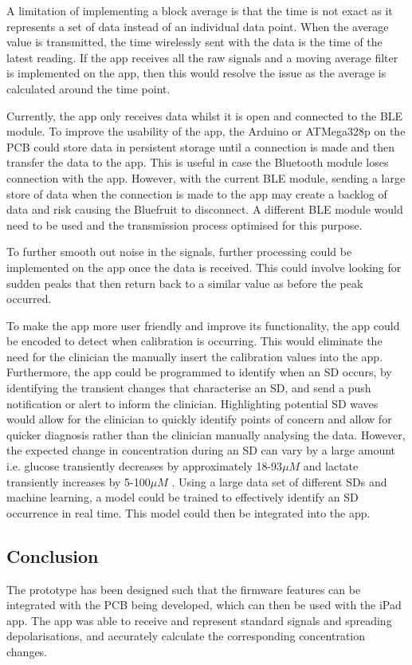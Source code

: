 A limitation of implementing a block average is that the time is not exact as it represents a set of data instead of an individual data point. When the average value is transmitted, the time wirelessly sent with the data is the time of the latest reading. If the app receives all the raw signals and a moving average filter is implemented on the app, then this would resolve the issue as the average is calculated around the time point.

Currently, the app only receives data whilst it is open and connected to the BLE module. To improve the usability of the app, the Arduino or ATMega328p on the PCB could store data in persistent storage until a connection is made and then transfer the data to the app. This is useful in case the Bluetooth module loses connection with the app. However, with the current BLE module, sending a large store of data when the connection is made to the app may create a backlog of data and risk causing the Bluefruit to disconnect. A different BLE module would need to be used and the transmission process optimised for this purpose.

To further smooth out noise in the signals, further processing could be implemented on the app once the data is received. This could involve looking for sudden peaks that then return back to a similar value as before the peak occurred. 

To make the app more user friendly and improve its functionality, the app could be encoded to detect when calibration is occurring. This would eliminate the need for the clinician the manually insert the calibration values into the app. Furthermore, the app could be programmed to identify when an SD occurs, by identifying the transient changes that characterise an SD, and send a push notification or alert to inform the clinician. Highlighting potential SD waves would allow for the clinician to quickly identify points of concern and allow for quicker diagnosis rather than the clinician manually analysing the data. However, the expected change in concentration during an SD can vary by a large amount i.e. glucose transiently decreases by approximately 18-93$\mu M$ and lactate transiently increases by 5-100$\mu M$ \cite{Rogers2017}. Using a large data set of different SDs and machine learning, a model could be trained to effectively identify an SD occurrence in real time. This model could then be integrated into the app.


\subsection{Conclusion}
The prototype has been designed such that the firmware features can be integrated with the PCB being developed, which can then be used with the iPad app. The app was able to receive and represent standard signals and spreading depolarisations, and accurately calculate the corresponding concentration changes.